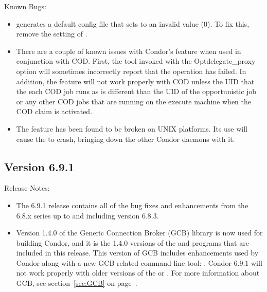 \noindent Known Bugs:

\begin{itemize}

\item {} generates a default config file that sets
 to an invalid value (0).  To fix this,
remove the setting of .

\item There are a couple of known issues with Condor's
 feature when used in conjunction with
COD. First, the  tool invoked with the
Opt{delegate\_proxy} option will sometimes incorrectly report that the
operation has failed. In addition, the 
feature will not work properly with COD unless the UID that the each
COD job runs as is different than the UID of the opportunistic job or
any other COD jobs that are running on the execute machine when the
COD claim is activated.

\item The  feature has been found
to be broken on UNIX platforms. Its use will cause the 
to crash, bringing down the other Condor daemons with it.

\end{itemize}



\subsection*{\label{sec:New-6-9-1}Version 6.9.1}

\noindent Release Notes:

\begin{itemize}

\item The 6.9.1 release contains all of the bug fixes and enhancements
  from the 6.8.x series up to and including version 6.8.3.

\item Version 1.4.0 of the Generic Connection Broker (GCB) library is
  now used for building Condor, and it is the 1.4.0 versions of the
   and  programs that are
  included in this release.
  This version of GCB includes enhancements used by Condor
  along with a new GCB-related command-line tool:
  .
  Condor 6.9.1 will not work properly with older versions of the
   or .
  For more information about GCB, see section~\ref{sec:GCB} on
  page~\pageref{sec:GCB}. 

\end{itemize}


